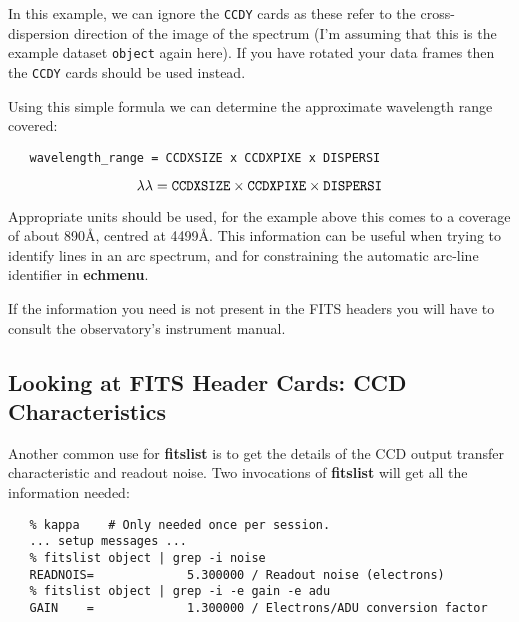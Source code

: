 \documentclass[twoside,11pt]{article}
\newenvironment{latexonly}{}{}
\newcommand{\htmlref}[2]{#1}
\newcommand{\xref}[3]{#1}
\newcommand{\xlabel}[1]{}
\newcommand{\mlabel}[1]{\xlabel{#1}\label{#1}}
\newcommand{\scspec}[2]{#1}
\newcommand{\scspec}[2]{#2}
\begin{document}
In this example, we can ignore the \verb+CCDY+ cards as these refer
to the cross-dispersion direction of the image of the spectrum (I'm
assuming that this is the example dataset \verb+object+ again here).
If you have rotated your data frames then the \verb+CCDY+ cards
should be used instead.

Using this simple formula we can determine
the approximate wavelength range covered:

\begin{htmlonly}
\begin{verbatim}
   wavelength_range = CCDXSIZE x CCDXPIXE x DISPERSI
\end{verbatim}
\end{htmlonly}
\begin{latexonly}
\begin{displaymath}
\lambda\lambda = {\tt{CCDXSIZE}} \times {\tt{CCDXPIXE}} \times {\tt{DISPERSI}}
\end{displaymath}
\end{latexonly}

Appropriate units should be used, for the example above this comes to
a coverage of about 890\AA , centred at 4499\AA\@.  This information can
be useful when trying to identify lines in an arc spectrum, and for
constraining the automatic arc-line identifier in
\xref{{\bf echmenu}}{sun152}{option10}\@.

If the information you need is not present in the FITS
headers you will have to consult the observatory's instrument manual.


\subsection{\mlabel{cook_ccdchar}Looking at FITS Header Cards: CCD
            Characteristics}

Another common use for \xref{{\bf fitslist}}{sun95}{FITSLIST} is to
get the details of the \htmlref{CCD}{gl_ccd}
\htmlref{output transfer characteristic}{gl_gain}
and \htmlref{readout noise}{gl_readout_noise}\@.
Two invocations of {\bf fitslist} will get all the information needed:

{
\scspec{\small}{ }
\begin{verbatim}
   % kappa    # Only needed once per session.
   ... setup messages ...
   % fitslist object | grep -i noise
   READNOIS=             5.300000 / Readout noise (electrons)
   % fitslist object | grep -i -e gain -e adu
   GAIN    =             1.300000 / Electrons/ADU conversion factor
\end{verbatim}
}
\end{document}
